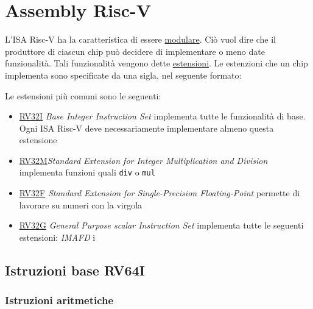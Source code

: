 \section{Assembly Risc-V}
L'ISA Risc-V ha la caratteristica di essere \underline{modulare}. Ciò vuol dire che il produttore di ciascun chip può decidere di implementare o meno date funzionalità. Tali funzionalità vengono dette \underline{estensioni}. Le estenzioni che un chip implementa sono specificate da una sigla, nel seguente formato:
\begin{center}
\end{center}
Le estensioni più comuni sono le seguenti:
\begin{itemize}
	\item \underline{RV32I} \textit{Base Integer Instruction Set} implementa tutte le funzionalità di base. Ogni ISA Risc-V deve necessariamente implementare almeno questa estensione
	\item \underline{RV32M}\textit{Standard Extension for Integer Multiplication and Division} implementa funzioni quali \verb|div| o \verb|mul|
	\item \underline{RV32F} \textit{Standard Extension for Single-Precision Floating-Point} permette di lavorare su numeri con la virgola
	\item \underline{RV32G} \textit{General Purpose scalar Instruction Set} implementa tutte le seguenti estensioni: \textit{IMAFD}
	      i
\end{itemize}
\subsection{Istruzioni base RV64I}
\subsubsection*{Istruzioni aritmetiche}
